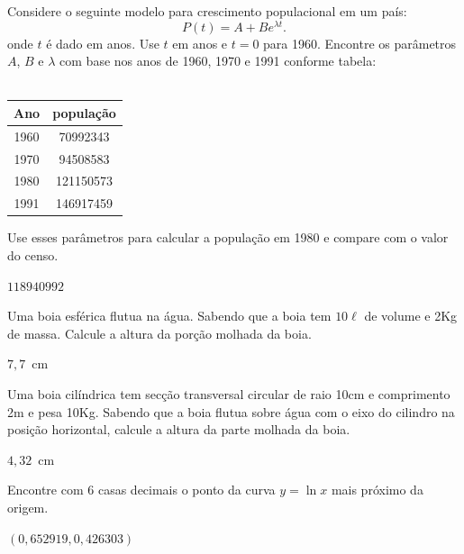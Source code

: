 \begin{Exercise}\label{pop} Considere o seguinte modelo para crescimento populacional em um país:
$$P(t)=A+Be^{\lambda t}.$$
onde $t$ é dado em anos. Use $t$ em anos e $t=0$ para 1960. Encontre os parâmetros $A$, $B$ e $\lambda$ com base nos anos de 1960, 1970 e 1991 conforme tabela:\\~

\begin{tabular}{|c|c|}
\hline
Ano & população\\
\hline
1960&70992343\\
1970&94508583\\
1980&121150573\\
1991&146917459\\
\hline	
\end{tabular}

Use esses parâmetros para calcular a população em 1980 e compare com o valor do censo.
\end{Exercise}
\begin{Answer}
  \begin{tiny}
$118940992$
  \end{tiny}
\end{Answer}

\begin{Exercise}[title=Fluidos]\label{boiaesf} Uma boia esférica flutua na água. Sabendo que a boia tem $10\ell$ de volume e 2Kg de massa. Calcule a altura da porção molhada da boia.
\end{Exercise}
\begin{Answer}
  \begin{tiny}
$7,7$~cm    
  \end{tiny}
\end{Answer}

\begin{Exercise}[title= Fluidos]\label{boiacil} Uma boia cilíndrica tem secção transversal circular de raio 10cm e comprimento 2m e pesa 10Kg. Sabendo que a boia flutua sobre água com o eixo do cilindro na posição horizontal, calcule a altura da parte molhada da boia.
\end{Exercise}
\begin{Answer}
  \begin{tiny}
$4,32$~cm    
  \end{tiny}
\end{Answer}

\begin{Exercise} Encontre com 6 casas decimais o ponto da curva $y=\ln x$ mais próximo da origem.
\end{Exercise}
\begin{Answer}
  \begin{tiny}
$(0,652919, 0,426303)$    
  \end{tiny}
\end{Answer}


